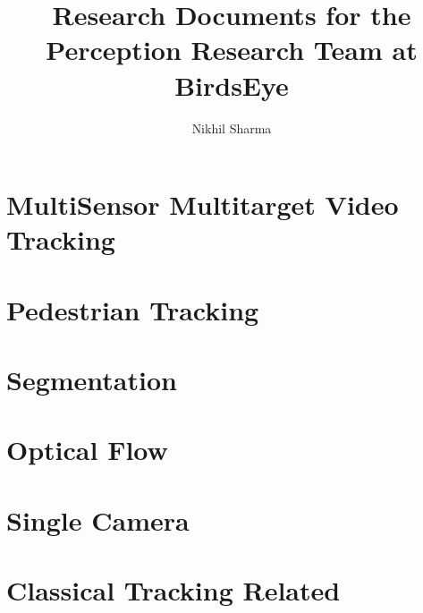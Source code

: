 \documentclass{article}
\author{Nikhil Sharma}
\title{Research Documents for the Perception Research Team at BirdsEye}
\begin{document}
   \maketitle
    \immediate{}

    \section{MultiSensor Multitarget Video Tracking}
    

    \section{Pedestrian Tracking}
    

    \section{Segmentation}
    

    \section{Optical Flow}
    

    \section{Single Camera}
    
    
    \section{Classical Tracking Related}
    		
    
    
\end{document}
